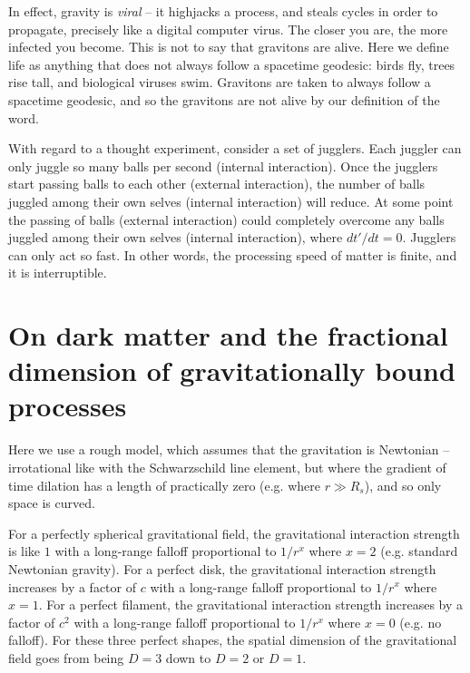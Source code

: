 \documentclass[12pt]{article}
\begin{document}
In effect, gravity is {\textit{viral}} -- it highjacks a process, and steals cycles in order to propagate, precisely like a digital computer virus.
The closer you are, the more infected you become.
This is not to say that gravitons are alive.
Here we define life as anything that does not always follow a spacetime geodesic: birds fly, trees rise tall, and biological viruses swim.
Gravitons are taken to always follow a spacetime geodesic, and so the gravitons are not alive by our definition of the word.

With regard to a thought experiment, consider a set of jugglers.
Each juggler can only juggle so many balls per second (internal interaction).
Once the jugglers start passing balls to each other (external interaction), the number of balls juggled among their own selves (internal interaction) will reduce.
At some point the passing of balls (external interaction) could completely overcome any balls juggled among their own selves (internal interaction), where $dt'/dt = 0$.
Jugglers can only act so fast. 
In other words, the processing speed of matter is finite, and it is interruptible.




\section{On dark matter and the fractional dimension of gravitationally bound processes}

Here we use a rough model, which assumes that the gravitation is Newtonian -- irrotational like with the Schwarzschild line element, but where the gradient of time dilation has a length of practically zero (e.g. where $r \gg R_s$), and so only space is curved.

For a perfectly spherical gravitational field, the gravitational interaction strength is like $1$ with a long-range falloff proportional to $1/r^x$ where $x = 2$ (e.g. standard Newtonian gravity).
For a perfect disk, the gravitational interaction strength increases by a factor of $c$ with a long-range falloff proportional to $1/r^x$ where $x = 1$.
For a perfect filament, the gravitational interaction strength increases by a factor of $c^2$ with a long-range falloff proportional to $1/r^x$ where $x = 0$ (e.g. no falloff).
For these three perfect shapes, the spatial dimension of the gravitational field goes from being $D = 3$ down to $D = 2$ or $D = 1$.
\end{document}
